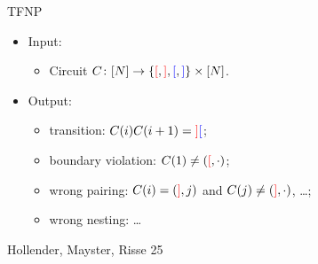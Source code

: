 \begin{frame}{TFNP}

    \begin{itemize}
        \item Input:
            \begin{itemize}
                \item Circuit $C \colon [N] \to \{\textcolor{red}{[}, \textcolor{red}{]},
                    \textcolor{blue}{[}, \textcolor{blue}{]}\} \times [N]$. 
            \end{itemize}
            \pause
        \item Output:
            \begin{itemize}
                \item transition: $C(i) C(i + 1) = \textcolor{red}{]} \textcolor{blue}{[}$;
                \item boundary violation: $C(1) \neq (\textcolor{red}{[}, \cdot)$;
                \item wrong pairing: $C(i) = (\textcolor{red}{]}, j)$ and $C(j) \neq (\textcolor{red}{]},
                    \cdot)$, \dots;
                \item wrong nesting: \dots
            \end{itemize}
    \end{itemize}
\end{frame}


\begin{frame}{Hollender, Mayster, Risse 25}

    \begin{center}
                
    \end{center}
    
\end{frame}